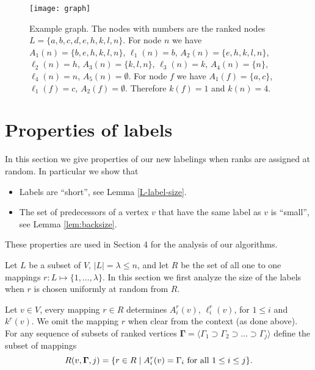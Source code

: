 \documentclass[11pt]{article}
\newcommand{\bGamma}{\boldsymbol{\Gamma}}
\theoremstyle{plain}
\theoremstyle{definition}
\theoremstyle{remark}
\numberwithin{equation}{section}
\begin{document}
\begin{figure}[t]
\centering
\ifpdf
\texttt{[image: graph]}
\else
{}
\fi

\caption{Example graph. The nodes with numbers are the ranked nodes $L=\{a,b,c,d,e,h,k,l,n\}$.  For node $n$ we have $A_1(n)= \{b,e,h,k,l,n\}$, $\ell_1(n)=b$, $A_2(n)=\{e,h,k,l,n\}$, $\ell_2(n)=h$, $A_3(n)=\{k,l,n\}$, $\ell_3(n)=k$,  $A_4(n)=\{n\}$, $\ell_4(n)=n$, $A_5(n)=\emptyset$.  For node $f$ we have $A_1(f)=\{a,c\}$, $\ell_1(f)=c$, $A_2(f)=\emptyset$.
Therefore $k(f)=1$ and $k(n)= 4$. \label{graph:fig}}
\end{figure}

\section{Properties of labels}  \label{labels:sec}

In this section we give properties of our new labelings when ranks are assigned at random. In particular we show that
\begin{itemize}
  \item Labels are ``short'', see Lemma \ref{L-label-size}.
  \item The set of predecessors of a vertex $v$ that have the same label as $v$ is ``small'', see Lemma \ref{lem:backsize}.
\end{itemize}
These properties are used in Section 4 for the analysis of our algorithms.


Let $L$ be a subset of $V$, $|L| = \lambda \le n$, and let $R$ be
the set of all one to one mappings $r:L\mapsto
\{1,\ldots,\lambda\}$. In this section we first analyze the size of
the labels when $r$ is chosen uniformly at random from $R$.

Let $v\in V$, every mapping $r\in R$ determines  $A^r_i(v)$,
$\ell^r_i(v)$,  for $1 \leq i$ and $k^r(v)$. We omit the mapping $r$
when clear from the context (as done above). For any sequence of
subsets of ranked vertices  $\bGamma = \langle \Gamma_1 \supset
\Gamma_2 \supset \dots \supset \Gamma_{j}\rangle$  define the subset
of mappings
$$R(v,\bGamma,j) = \{r\in R \mid A^r_i(v) = \Gamma_i \mbox{\rm\ for
all $1 \leq i \leq j$}\}.$$
\end{document}
